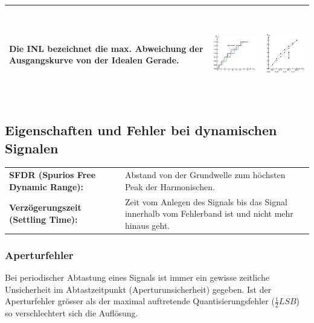 \begin{tabular}{|p{5.5cm}|c|c|}
  Die INL bezeichnet die max. Abweichung der Ausgangskurve von der Idealen Gerade.
	& \includegraphics[height=3.5cm, valign=t]{./images/INL_ADC.png}
	& \includegraphics[height=4cm, valign=t]{./images/INL_DAC.png}
	\\ \hline
\end{tabular}
\subsection{Eigenschaften und Fehler bei dynamischen Signalen}

\begin{tabular}{l p{11cm}}
  \textbf{SFDR (Spurios Free Dynamic Range):} &
  Abstand von der Grundwelle zum höchsten Peak der Harmonischen. \\
  \textbf{Verzögerungszeit (Settling Time):} &
  Zeit vom Anlegen des Signals bis das Signal innerhalb vom Fehlerband ist und nicht mehr hinaus geht.
\end{tabular}

\subsubsection{Aperturfehler} 
Bei periodischer Abtastung eines Signals ist immer ein gewisse zeitliche
Unsicherheit im Abtastzeitpunkt (Aperturunsicherheit) gegeben. Ist der Aperturfehler grösser als der maximal auftretende Quantisierungsfehler ($\frac{1}{2}LSB$) so verschlechtert sich die Auflösung.
\newpage

